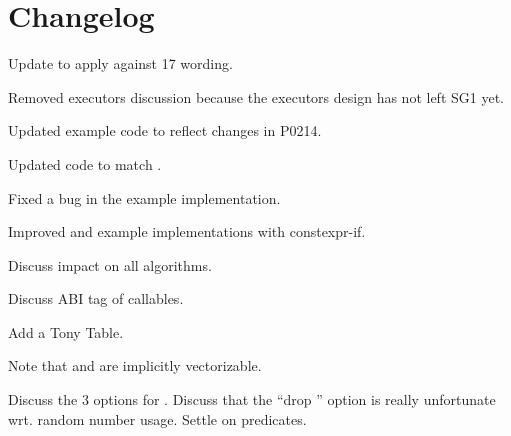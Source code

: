 \section{Changelog}
\begin{revision}
  \item Update to apply against \CC{}17 wording.
  \item Removed executors discussion because the executors design has not left SG1 yet.
  \item Updated example code to reflect changes in P0214.
\end{revision}

\begin{revision}
  \item Updated code to match \cite{N4744}.
  \item Fixed a bug in the  example implementation.
  \item Improved  and  example implementations with constexpr-if.
  \item Discuss impact on all algorithms.
\end{revision}

\begin{revision}
  \item Discuss ABI tag of  callables.
  \item Add a Tony Table.
  \item Note that  and  are implicitly vectorizable.
\end{revision}

\begin{revision}
  \todo Discuss the 3 options for .
  \todo Discuss that the “drop ” option is really unfortunate wrt. random number usage.
  \todo Settle on  predicates.
\end{revision}

